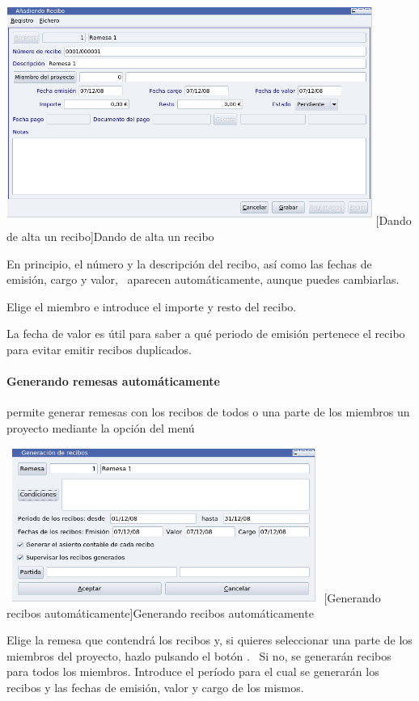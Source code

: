 \begin{center}
\includegraphics[width=11.956cm,height=7.419cm]{manual-img20.png}
[Dando de alta un recibo]{Dando de alta un recibo}

\end{center}
En principio, el número y la descripción del recibo, así como las
fechas de emisión, cargo y valor, \ aparecen automáticamente,
aunque puedes cambiarlas.

Elige el miembro e introduce el importe y resto del recibo. 

La fecha de valor es útil para saber a qué periodo de emisión
pertenece el recibo para evitar emitir recibos duplicados.

\paragraph{Generando remesas automáticamente}
\appname permite generar remesas con los recibos de todos o una parte de
los miembros un proyecto mediante la opción del menú
\textstyleGUIELEMENT{$\rightarrow
$}

\begin{center}
\includegraphics[width=10.261cm,height=5.041cm]{manual-img21.png}
[Generando recibos automáticamente]{Generando
recibos automáticamente}

\end{center}
Elige la remesa que contendrá los recibos y, si quieres seleccionar
una parte de los miembros del proyecto, hazlo pulsando el botón
. \ Si no, se generarán recibos para
todos los miembros. Introduce el período para el cual se generarán
los recibos y las fechas de emisión, valor y cargo de los mismos. 

